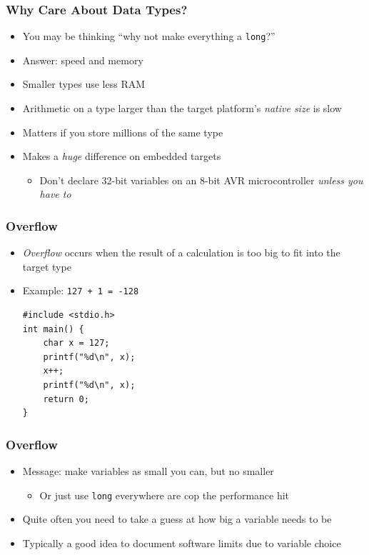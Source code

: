 \documentclass[14pt]{beamer}
\begin{document}
\begin{frame}
\frametitle{Why Care About Data Types?}
\begin{itemize}
\item You may be thinking ``why not make everything a \texttt{long}?''
\item Answer: speed and memory
\item Smaller types use less RAM
\item Arithmetic on a type larger than the target platform's \textit{native size} is slow
\item Matters if you store millions of the same type
\item Makes a \textit{huge} difference on embedded targets
\begin{itemize}
	\item Don't declare 32-bit variables on an 8-bit AVR microcontroller \textit{unless you have to}
\end{itemize}
\end{itemize}
\end{frame}

\begin{frame}[fragile]
\frametitle{Overflow}
\small{
\begin{itemize}
\item \textit{Overflow} occurs when the result of a calculation is too big to fit into the target type
\item Example: \texttt{127 + 1 = -128}
\begin{lstlisting}[style=CStyle,caption=\texttt{overflow.c}]
#include <stdio.h>
int main() {
	char x = 127;
	printf("%d\n", x);
	x++;
	printf("%d\n", x);
	return 0;
}
\end{lstlisting}

\end{itemize}
}
\end{frame}

\begin{frame}
\frametitle{Overflow}
\begin{itemize}
\item Message: make variables as small you can, but no smaller
	\begin{itemize}
		\item Or just use \texttt{long} everywhere are cop the performance hit
	\end{itemize}
\item Quite often you need to take a guess at how big a variable needs to be
\item Typically a good idea to document software limits due to variable choice
\end{itemize}
\end{frame}
\end{document}
